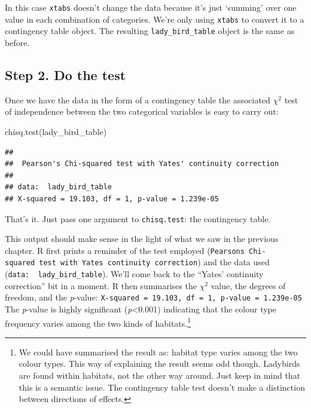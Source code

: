 \documentclass[
]{book}
\newenvironment{Shaded}{\begin{snugshade}}{\end{snugshade}}
\newcommand{\FunctionTok}[1]{\textcolor[rgb]{0.00,0.00,0.00}{#1}}
\newcommand{\NormalTok}[1]{#1}
\begin{document}
In this case \texttt{xtabs} doesn't change the data because it's just `summing' over one value in each combination of categories. We're only using \texttt{xtabs} to convert it to a contingency table object. The resulting \texttt{lady\_bird\_table} object is the same as before.

\hypertarget{step-2.-do-the-test}{%
\subsection{Step 2. Do the test}\label{step-2.-do-the-test}}

Once we have the data in the form of a contingency table the associated \(\chi^{2}\) test of independence between the two categorical variables is easy to carry out:

\begin{Shaded}
\begin{Highlighting}[]
\FunctionTok{chisq.test}\NormalTok{(lady\_bird\_table)}
\end{Highlighting}
\end{Shaded}

\begin{verbatim}
## 
##  Pearson's Chi-squared test with Yates' continuity correction
## 
## data:  lady_bird_table
## X-squared = 19.103, df = 1, p-value = 1.239e-05
\end{verbatim}

That's it. Just pass one argument to \texttt{chisq.test}: the contingency table.

This output should make sense in the light of what we saw in the previous chapter. R first prints a reminder of the test employed (\texttt{Pearson\textquotesingle{}s\ Chi-squared\ test\ with\ Yates\textquotesingle{}\ continuity\ correction}) and the data used (\texttt{data:\ \ lady\_bird\_table}). We'll come back to the ``Yates' continuity correction'' bit in a moment. R then summarises the \(\chi^{2}\) value, the degrees of freedom, and the \emph{p}-value: \texttt{X-squared\ =\ 19.103,\ df\ =\ 1,\ p-value\ =\ 1.239e-05} The \emph{p}-value is highly significant (\emph{p}\textless0.001) indicating that the colour type frequency varies among the two kinds of habitats.\footnote{We could have summarised the result as: habitat type varies among the two colour types. This way of explaining the result seems odd though. Ladybirds are found within habitats, not the other way around. Just keep in mind that this is a semantic issue. The contingency table test doesn't make a distinction between directions of effects.}
\end{document}

